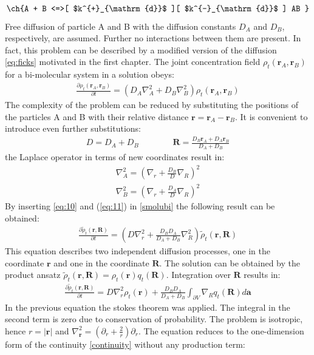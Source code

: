 \documentclass[
  a4paper,BCOR10mm,oneside,
  headsepline,footsepline,%
  fleqn,openbib
]{scrbook}
\begin{document}
\begin{align}\label{reactionscemebi}
\text{\ch{A + B <=>[ $k^{+}_{\mathrm{d}}$ ][ $k^{-}_{\mathrm{d}}$ ] AB }}
\end{align}
Free diffusion of particle A and B with the diffusion constants $D_A$ and $D_B$, respectively, are assumed. Further no interactions between them are present. In fact, this problem can be described by a modified version of the diffusion \cref{eq:ficks} motivated in the first chapter.
The joint concentration field $\rho_t(\bm{r}_A,\bm{r}_B)$ for a bi-molecular system in a solution obeys:
\begin{align}
 \frac{\partial \rho_t(\bm{r}_A,\bm{r}_B)}{\partial t}=(D_A \nabla^{2}_{A}+D_B \nabla^{2}_{B}) \rho_t(\bm{r}_A,\bm{r}_B) \label{smolubi}
\end{align}
The complexity of the problem can be reduced by substituting the positions of the particles A and B with their relative distance $\bm{r}=\bm{r}_A-\bm{r}_B$. It is convenient to introduce even further substitutions:
\begin{align}
 D= D_A+D_B \qquad \qquad \bm{R}=\frac{D_B \bm{r}_A+ D_A \bm{r}_B}{D_A+D_B}
\end{align}
the Laplace operator in terms of new coordinates result in:
\begin{align}
\nabla^{2}_{A} = \left( \nabla_r+\frac{D_B}{D} \nabla_R \right)^2 \label{eq:10}\\
\nabla^{2}_{B} = \left( \nabla_r+\frac{D_A}{D} \nabla_R \right)^2 \label{eq:11}
\end{align}
By inserting \cref{eq:10}  and (\ref{eq:11}) in \cref{smolubi} the following result can be obtained:
\begin{align}
 \frac{\partial \tilde{\rho}_t(\bm{r},\bm{R})}{\partial t}=\left(D \nabla^{2}_{r}+\frac{D_B D_A}{D_A+D_B}\nabla^{2}_{R}\right) \tilde{\rho}_t(\bm{r},\bm{R})
\end{align}
This equation describes two independent diffusion processes, one in the coordinate $\bm{r}$ and one in the coordinate $\bm{R}$. The solution can be obtained by the product ansatz $\tilde{\rho}_t(\bm{r},\bm{R})=\rho_t(\bm{r})q_t(\bm{R})$. Integration over $\bm{R}$ results in:
\begin{align}
\frac{\partial \tilde{\rho}_t(\bm{r},\bm{R})}{\partial t}=D \nabla^{2}_{r} \rho_t(\bm{r}) +\frac{D_B D_A}{D_A+D_B}   \int_{\partial V} \nabla_{R} q_t(\bm{R}) d \bm{a}
\end{align}
In the previous equation the stokes theorem was applied. The integral in the second term is zero due to conservation of probability. The problem is isotropic, hence $r=|\bm{r}|$ and $\nabla^{2}_{\bm{r}}=\left(\partial_r+\frac{2}{r}\right)\partial_r$. The equation reduces to the one-dimension form of the continuity \cref{continuity} without any production term:
\end{document}
